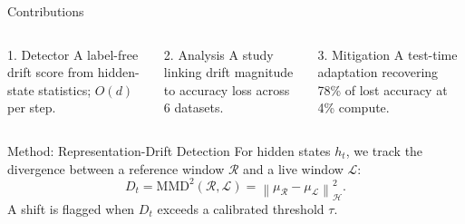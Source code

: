 \documentclass[aspectratio=169,11pt]{beamer}
\begin{document}
\begin{frame}{Contributions}
  \begin{columns}[T]
      \begin{block}{1. Detector}
        A label-free drift score from hidden-state statistics; $O(d)$ per step.
      \end{block}
      \begin{block}{2. Analysis}
        A study linking drift magnitude to accuracy loss across 6 datasets.
      \end{block}
      \begin{block}{3. Mitigation}
        A test-time adaptation recovering 78\% of lost accuracy at 4\% compute.
      \end{block}
  \end{columns}
\end{frame}


\begin{frame}{Method: Representation-Drift Detection}
  For hidden states $h_t$, we track the divergence between a reference window
  $\mathcal{R}$ and a live window $\mathcal{L}$:
  \begin{equation}
    D_t = \mathrm{MMD}^2\!\left(\mathcal{R},\mathcal{L}\right)
        = \left\lVert \mu_\mathcal{R} - \mu_\mathcal{L}\right\rVert^2_{\mathcal{H}}.
  \end{equation}
  A shift is flagged when $D_t$ exceeds a calibrated threshold $\tau$.
  \vspace{4pt}
  \begin{center}
  \end{center}
\end{frame}
\end{document}
